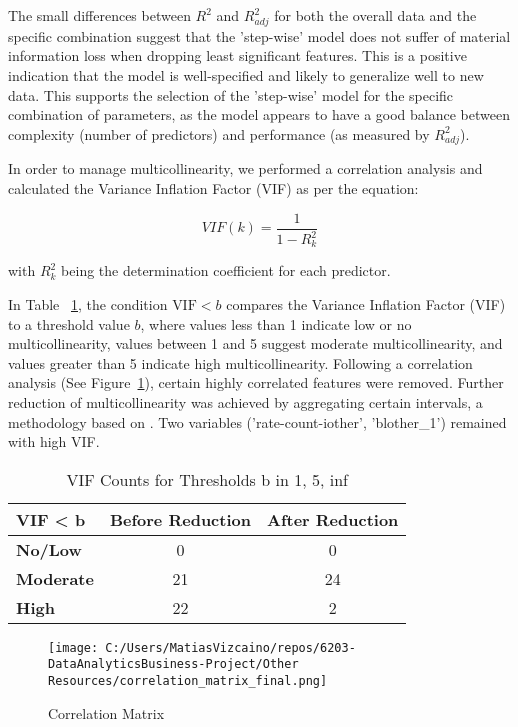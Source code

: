 \documentclass{article}
\begin{document}
The small differences between \(R^2\) and \(R^2_{adj}\) for both the overall data and the specific combination suggest that the 'step-wise' model does not suffer of material information loss when dropping least significant features. This is a positive indication that the model is well-specified and likely to generalize well to new data. This supports the selection of the 'step-wise' model for the specific combination of parameters, as the model appears to have a good balance between complexity (number of predictors) and performance (as measured by \(R^2_{adj}\)).

In order to manage multicollinearity, we performed a correlation analysis and calculated the Variance Inflation Factor (VIF) as per the equation:

\begin{equation}
  VIF(k) = \frac{1}{1 - R^2_k}
\end{equation}

with $R^2_k$ being the determination coefficient for each predictor.

In Table ~\ref{fig:VIF-analysis}, the condition \( \text{VIF} < b \) compares the Variance Inflation Factor (VIF) to a threshold value \( b \), where values less than 1 indicate low or no multicollinearity, values between 1 and 5 suggest moderate multicollinearity, and values greater than 5 indicate high multicollinearity. Following a correlation analysis (See Figure~\ref{fig:correlation-matrix}), certain highly correlated features were removed. Further reduction of multicollinearity was achieved by aggregating certain intervals, a methodology based on \cite{Miori2023}. Two variables ('rate-count-iother', 'blother\_1') remained with high VIF. 

\begin{table}[h]
\centering
\begin{tabular}{lcc}
\hline
 VIF \textless{} b & \textbf{Before Reduction} & \textbf{After Reduction} \\
\hline
\textbf{No/Low} & 0 & 0 \\
\textbf{Moderate} & 21 & 24 \\
\textbf{High} & 22 & 2 \\
\hline
\end{tabular}
\caption{VIF Counts for Thresholds b in {1, 5, inf}}
\label{fig:VIF-analysis}
\end{table}

\begin{figure}[htbp]
  \centering
  \texttt{[image: C:/Users/MatiasVizcaino/repos/6203-DataAnalyticsBusiness-Project/Other Resources/correlation\_matrix\_final.png]}
  \caption{Correlation Matrix}
  \label{fig:correlation-matrix}
\end{figure}
\end{document}
